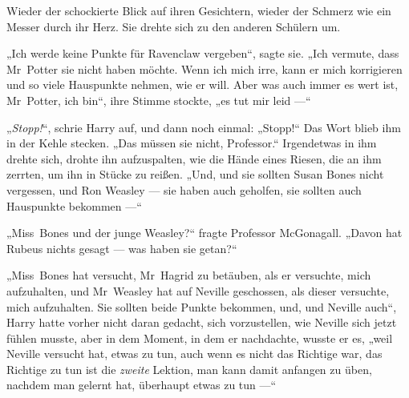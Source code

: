 Wieder der schockierte Blick auf ihren Gesichtern, wieder der Schmerz wie ein Messer durch ihr Herz.
Sie drehte sich zu den anderen Schülern um.

„Ich werde keine Punkte für Ravenclaw vergeben“, sagte sie.
„Ich vermute, dass Mr~Potter sie nicht haben möchte. Wenn ich mich irre, kann er mich korrigieren und so viele Hauspunkte nehmen, wie er will. Aber was auch immer es wert ist, Mr~Potter, ich bin“, ihre Stimme stockte, „es tut mir leid —“

\later

„\emph{Stopp!}“, schrie Harry auf, und dann noch einmal:
„Stopp!“ Das Wort blieb ihm in der Kehle stecken.
„Das müssen sie nicht, Professor.“ Irgendetwas in ihm drehte sich, drohte ihn aufzuspalten, wie die Hände eines Riesen, die an ihm zerrten, um ihn in Stücke zu reißen.
„Und, und sie sollten Susan Bones nicht vergessen, und Ron Weasley — sie haben auch geholfen, sie sollten auch Hauspunkte bekommen —“

„Miss~Bones und der junge Weasley?“ fragte Professor McGonagall.
„Davon hat Rubeus nichts gesagt — was haben sie getan?“

„Miss~Bones hat versucht, Mr~Hagrid zu betäuben, als er versuchte, mich aufzuhalten, und Mr~Weasley hat auf Neville geschossen, als dieser versuchte, mich aufzuhalten. Sie sollten beide Punkte bekommen, und, und Neville auch“, Harry hatte vorher nicht daran gedacht, sich vorzustellen, wie Neville sich jetzt fühlen musste, aber in dem Moment, in dem er nachdachte, wusste er es, „weil Neville versucht hat, etwas zu tun, auch wenn es nicht das Richtige war, das Richtige zu tun ist die \emph{zweite} Lektion, man kann damit anfangen zu üben, nachdem man gelernt hat, überhaupt etwas zu tun —“

